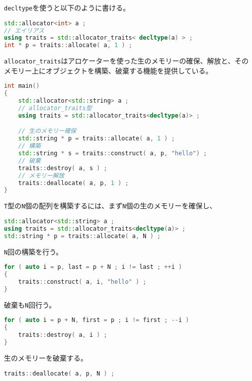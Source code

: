 \texttt{decltype}を使うと以下のように書ける。

\begin{lstlisting}[language={C++}]
std::allocator<int> a ;
// エイリアス
using traits = std::allocator_traits< decltype(a) > ;
int * p = traits::allocate( a, 1 ) ;
\end{lstlisting}

\texttt{allocator\_traits}はアロケーターを使った生のメモリーの確保、解放と、そのメモリー上にオブジェクトを構築、破棄する機能を提供している。

\begin{lstlisting}[language={C++}]
int main()
{
    std::allocator<std::string> a ;
    // allocator_traits型
    using traits = std::allocator_traits<decltype(a)> ;

    // 生のメモリー確保
    std::string * p = traits::allocate( a, 1 ) ;
    // 構築
    std::string * s = traits::construct( a, p, "hello") ;
    // 破棄
    traits::destroy( a, s ) ;
    // メモリー解放
    traits::deallocate( a, p, 1 ) ;
}
\end{lstlisting}

\texttt{T}型の\texttt{N}個の配列を構築するには、まず\texttt{N}個の生のメモリーを確保し、
\begin{lstlisting}[language={C++}]
std::allocator<std::string> a ;
using traits = std::allocator_traits<decltype(a)> ;
std::string * p = traits::allocate( a, N ) ;
\end{lstlisting}
\texttt{N}回の構築を行う。

\ifTombow\pagebreak\fi
\begin{lstlisting}[language={C++}]
for ( auto i = p, last = p + N ; i != last ; ++i )
{
    traits::construct( a, i, "hello" ) ;
}
\end{lstlisting}

破棄も\texttt{N}回行う。

\begin{lstlisting}[language={C++}]
for ( auto i = p + N, first = p ; i != first ; --i )
{
    traits::destroy( a, i ) ;
}
\end{lstlisting}

生のメモリーを破棄する。

\begin{lstlisting}[language={C++}]
traits::deallocate( a, p, N ) ;
\end{lstlisting}


